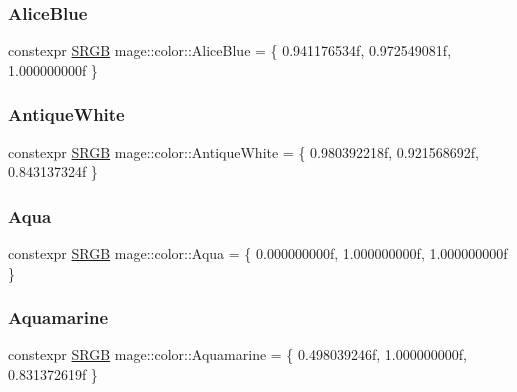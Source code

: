 \subsubsection{\texorpdfstring{Alice\+Blue}{AliceBlue}}
{\footnotesize\ttfamily constexpr \hyperlink{structmage_1_1_s_r_g_b}{S\+R\+GB} mage\+::color\+::\+Alice\+Blue = \{ 0.\+941176534f, 0.\+972549081f, 1.\+000000000f \}}

\hypertarget{namespacemage_1_1color_a4c8213a7462da60a947162c1d487d584}{}\label{namespacemage_1_1color_a4c8213a7462da60a947162c1d487d584} 
\subsubsection{\texorpdfstring{Antique\+White}{AntiqueWhite}}
{\footnotesize\ttfamily constexpr \hyperlink{structmage_1_1_s_r_g_b}{S\+R\+GB} mage\+::color\+::\+Antique\+White = \{ 0.\+980392218f, 0.\+921568692f, 0.\+843137324f \}}

\hypertarget{namespacemage_1_1color_aceff28758fa426deb7306624036b1707}{}\label{namespacemage_1_1color_aceff28758fa426deb7306624036b1707} 
\subsubsection{\texorpdfstring{Aqua}{Aqua}}
{\footnotesize\ttfamily constexpr \hyperlink{structmage_1_1_s_r_g_b}{S\+R\+GB} mage\+::color\+::\+Aqua = \{ 0.\+000000000f, 1.\+000000000f, 1.\+000000000f \}}

\hypertarget{namespacemage_1_1color_ae5e7fd9509049a5d51f5793dda07c89a}{}\label{namespacemage_1_1color_ae5e7fd9509049a5d51f5793dda07c89a} 
\subsubsection{\texorpdfstring{Aquamarine}{Aquamarine}}
{\footnotesize\ttfamily constexpr \hyperlink{structmage_1_1_s_r_g_b}{S\+R\+GB} mage\+::color\+::\+Aquamarine = \{ 0.\+498039246f, 1.\+000000000f, 0.\+831372619f \}}

\hypertarget{namespacemage_1_1color_a6d140b76616fdb0fe29b8e8111e3fdfd}{}\label{namespacemage_1_1color_a6d140b76616fdb0fe29b8e8111e3fdfd} 
